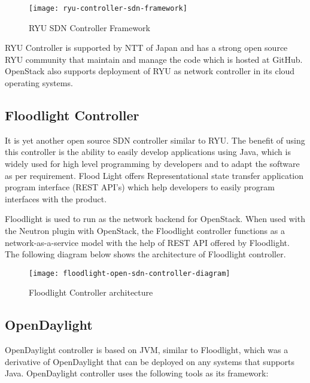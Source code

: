 \begin{figure}[H]
	  \centering
	  \texttt{[image: ryu-controller-sdn-framework]}
	  \caption{RYU SDN Controller Framework \cite{ryu_framewrk_png}} \label{fig:ryu-controller-sdn-framework}
	  \vspace{-10pt}
\end{figure}

RYU Controller is supported by NTT of Japan and has a strong open source RYU community that maintain and manage the code which is hosted at GitHub. OpenStack also supports deployment of RYU as network controller in its cloud operating systems.
\subsection{Floodlight Controller \cite{Floodlight_defn}} \label{Floodlight_Controller}

It is yet another open source SDN controller similar to RYU. The benefit of using this controller is the ability to easily develop applications using Java, which is widely used for high level programming by developers and to adapt the software as per requirement. Flood Light offers Representational state transfer application program interface (REST API’s) which help developers to easily program interfaces with the product.

Floodlight is used to run as the network backend for OpenStack. When used with the Neutron plugin with OpenStack, the Floodlight controller functions as a network-as-a-service model with the help of REST API offered by Floodlight. The following diagram below shows the architecture of Floodlight controller.

\begin{figure}[H]
	\centering
	\texttt{[image: floodlight-open-sdn-controller-diagram]}
	\caption{Floodlight Controller architecture \cite{Floodlight_arch}} \label{fig:Floodlight_arch}
	\vspace{-10pt}
\end{figure}

\subsection{OpenDaylight} \label{Opendaylight}
OpenDaylight controller is based on JVM, similar to Floodlight, which was a derivative of OpenDaylight that can be deployed on any systems that supports Java. OpenDaylight controller uses the following tools as its framework:

